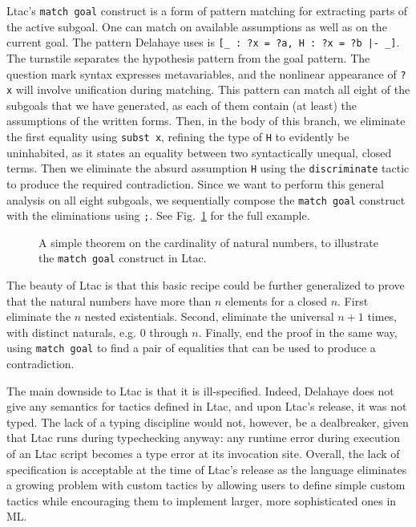 Ltac's \texttt{match goal} construct is a form of pattern matching for
extracting parts of the active subgoal.
One can match on available assumptions as well as on the current goal.
The pattern Delahaye uses is \texttt{[_ : ?x = ?a, H : ?x = ?b |- _]}.
The turnstile separates the hypothesis pattern from the goal pattern.
The question mark syntax expresses metavariables, and the nonlinear appearance
of \texttt{?x} will involve unification during matching.
This pattern can match all eight of the subgoals that we have generated, as
each of them contain (at least) the assumptions of the written forms.
Then, in the body of this branch, we eliminate the first equality using
\texttt{subst x}, refining the type of \texttt{H} to evidently be uninhabited,
as it states an equality between two syntactically unequal, closed terms.
Then we eliminate the absurd assumption \texttt{H} using the
\texttt{discriminate} tactic to produce the required contradiction.
Since we want to perform this general analysis on all eight subgoals, we
sequentially compose the \texttt{match goal} construct with the eliminations
using \texttt{;}.
See Fig.~\ref{fig:ltac-example} for the full example.

\begin{figure}[t]
  \caption{%
    A simple theorem on the cardinality of natural numbers, to illustrate the
    \texttt{match goal} construct in Ltac.%
  }
  \label{fig:ltac-example}
\end{figure}

The beauty of Ltac is that this basic recipe could be further generalized to
prove that the natural numbers have more than $n$ elements for a closed $n$.
First eliminate the $n$ nested existentials. Second, eliminate the universal
$n + 1$ times, with distinct naturals, e.g. $0$ through $n$.
Finally, end the proof in the same way, using \texttt{match goal} to find a pair
of equalities that can be used to produce a contradiction.

The main downside to Ltac is that it is ill-specified.
Indeed, Delahaye does not give any semantics for tactics defined in
Ltac, and upon Ltac's release, it was not typed.
The lack of a typing discipline would not, however, be a dealbreaker, given that
Ltac runs during typechecking anyway:
any runtime error during execution of an Ltac script becomes a
type error at its invocation site.
Overall, the lack of specification is acceptable at the time of Ltac's release
as the language eliminates a growing problem with custom tactics by allowing
users to define simple custom tactics while encouraging them to implement
larger, more sophisticated ones in ML.

